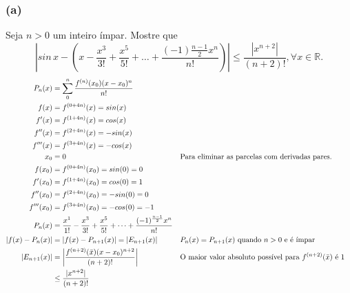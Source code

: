 \documentclass{article}
\begin{document}
\subsubsection{(a)}
Seja $n > 0$ um inteiro ímpar. Mostre que
\[
  \left| sin \, x
  - \left(x - \frac{x^3}{3!} + \frac{x^5}{5!} + \dots
  + \frac{(-1)\frac{n-1}{2} x^n}{n!}\right)\right|
  \leq \frac{|x^{n+2}|}{(n+2)!}, \forall x \in \mathbb{R}.
\]
\begin{align}
  P_n(x)
  &= \sum_0^n \frac{f^{(n)}(x_0)(x-x_0)^n}{n!} \\
  f(x)
  &= f^{(0 + 4n)}(x)
  = sin(x) \\
  f'(x)
  &= f^{(1 + 4n)}(x)
  = cos(x) \\
  f''(x)
  &= f^{(2 + 4n)}(x)
  = -sin(x) \\
  f'''(x)
  &= f^{(3 + 4n)}(x)
  = -cos(x) \\
  x_0
  &= 0
  && \text{Para eliminar as parcelas com derivadas pares.} \\
  f(x_0)
  &= f^{(0 + 4n)}(x_0)
  = sin(0)
  = 0 \\
  f'(x_0)
  &= f^{(1 + 4n)}(x_0)
  = cos(0)
  = 1 \\
  f''(x_0)
  &= f^{(2 + 4n)}(x_0)
  = -sin(0)
  = 0 \\
  f'''(x_0)
  &= f^{(3 + 4n)}(x_0)
  = -cos(0)
  = -1 \\
  P_n(x)
  &= \frac{x^1}{1!}
  - \frac{x^3}{3!}
  + \frac{x^5}{5!} + \dots + \frac{(-1)^{\frac{n-1}{2}}x^n}{n!} \\
  |f(x) - P_n(x)|
  &= |f(x) - P_{n+1}(x)|
  = |E_{n+1}(x)|
  && \text{$P_n(x) = P_{n+1}(x)$ quando $n > 0$ e é ímpar} \\
  |E_{n + 1}(x)|
  &= \left|\frac{f^{(n+2)}(\bar{x}) (x-x_0)^{n+2}}{(n+2)!}\right|
  && \text{O maior valor absoluto possível para $f^{(n+2)}(\bar{x})$ é 1} \\
  & \leq \frac{|x^{n+2}|}{(n+2)!} \notag
\end{align}
\setcounter{equation}{0}
\clearpage
\end{document}

